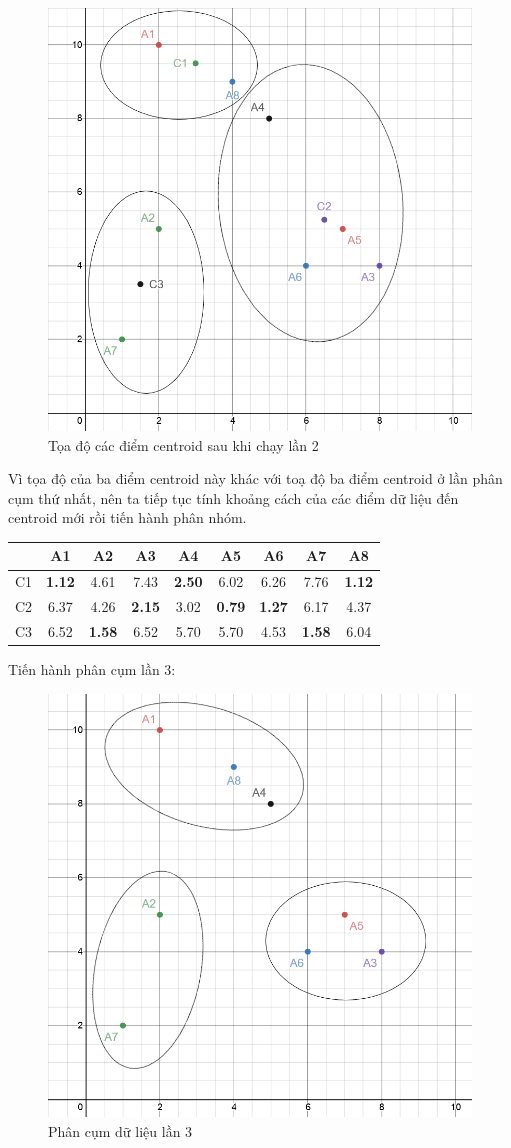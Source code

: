 \documentclass{article}
\begin{document}
	\begin{figure}[h]
		\centering
		\includegraphics[width=0.6\linewidth]{img/ex_5}
		\caption{Tọa độ các điểm centroid sau khi chạy lần 2}
	\end{figure}\par
	Vì tọa độ của ba điểm centroid này khác với toạ độ ba điểm centroid ở lần phân cụm thứ nhất, nên ta tiếp tục tính khoảng cách của các điểm dữ liệu đến centroid mới rồi tiến hành phân nhóm.
	\begin{table}[h]
		\centering
		\begin{tabular}{|c|c|c|c|c|c|c|c|c|}
			\hline
			& A1 & A2 & A3 & A4 & A5 & A6 & A7 & A8 \\
			\hline
			C1 & \textbf{1.12} & 4.61 & 7.43 & \textbf{2.50} & 6.02 & 6.26 & 7.76 & \textbf{1.12} \\
			\hline
			C2 & 6.37 & 4.26 & \textbf{2.15} & 3.02 & \textbf{0.79} & \textbf{1.27} & 6.17 & 4.37 \\
			\hline
			C3 & 6.52 & \textbf{1.58} & 6.52 & 5.70 & 5.70 & 4.53 & \textbf{1.58} & 6.04 \\
			\hline
		\end{tabular}
	\end{table}
	\newpage
	Tiến hành phân cụm lần 3:
	\begin{figure}[h]
		\centering
		\includegraphics[width=0.6\linewidth]{img/ex_6}
		\caption{Phân cụm dữ liệu lần 3}
	\end{figure}\par
\end{document}
